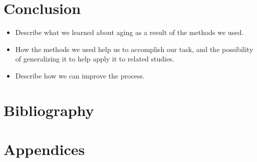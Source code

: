 \documentclass[11pt]{article}
\begin{document}
\section{Conclusion}
\begin{itemize}
\item Describe what we learned about aging as a result of the methods we used.
\item How the methods we used help us to accomplish our task, and the possibility of generalizing it to help apply it to related studies.
\item Describe how we can improve the process.
\end{itemize}

\section{Bibliography}


\section{Appendices}
\end{document}
